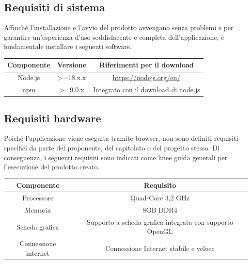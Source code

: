 \documentclass{article}
\begin{document}
\subsection{Requisiti di sistema}
Affinché l'installazione e l'avvio del prodotto avvengano senza problemi e per garantire un'esperienza d'uso soddisfacente e completa dell'applicazione, è fondamentale installare i seguenti software.
\begin{center}
\begin{tabular}{|c|c|c|}
\hline
\rowcolor{Blue}
Componente & Versione & Riferimenti per il download \\
\hline
\rowcolor{LighterBlue}
Node.js & >=18.x.x & \href{https://nodejs.org/en/}{https://nodejs.org/en/}\\
\hline
\rowcolor{LightBlue}
npm & >=9.0.x & Integrato con il download di node.js\\
\hline
\end{tabular}
\end{center}
\label{tab:requisitist}

\subsection{Requisiti hardware}
Poiché l'applicazione viene eseguita tramite browser, non sono definiti requisiti specifici da parte del proponente, del capitolato o del progetto stesso. Di conseguenza, i seguenti requisiti sono indicati come linee guida generali per l'esecuzione del prodotto creato.
\begin{center}
\begin{tabular}{|c|c|}
\hline
\rowcolor{Blue}
Componente & Requisito \\
\hline
\rowcolor{LighterBlue}
Processore & Quad-Core 3,2 GHz\\
\hline
\rowcolor{LightBlue}
Memoria & 8GB DDR4\\
\hline
\rowcolor{LighterBlue}
Scheda grafica & Supporto a scheda grafica integrata con supporto OpenGL\\
\hline
\rowcolor{LightBlue}
Connessione internet & Connessione Internet stabile e veloce\\
\hline
\end{tabular}
\end{center}
\label{tab:requisitihw}
\end{document}
